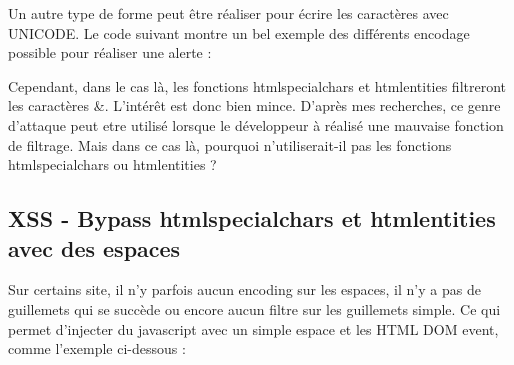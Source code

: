 \documentclass{article}
\begin{document}
Un autre type de forme peut être réaliser pour écrire les caractères avec UNICODE. Le code suivant montre un bel exemple des différents encodage possible pour réaliser une alerte :
\vspace{0.2cm}\\
\vspace{0.2cm}

Cependant, dans le cas là, les fonctions htmlspecialchars et htmlentities filtreront les caractères \&. L'intérêt est donc bien mince. D'après mes recherches, ce genre d'attaque peut etre utilisé lorsque le développeur à réalisé une mauvaise fonction de filtrage. Mais dans ce cas là, pourquoi n'utiliserait-il pas les fonctions htmlspecialchars ou htmlentities ?

\subsection{XSS - Bypass htmlspecialchars et htmlentities avec des espaces}

Sur certains site, il n'y parfois aucun encoding sur les espaces, il n'y a pas de guillemets qui se succède ou encore aucun filtre sur les guillemets simple. Ce qui permet d'injecter du javascript avec un simple espace et les HTML DOM event, comme l'exemple ci-dessous :
\vspace{0.2cm}\\
\vspace{0.2cm}
\end{document}
